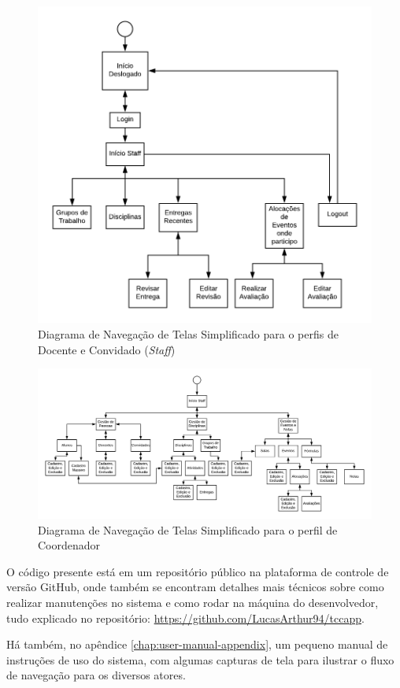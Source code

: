 \begin{figure}[!htpb]
    \centering
    \includegraphics[scale=1.1]{imagens/telas_staff.png}
    \caption{Diagrama de Navegação de Telas Simplificado para o perfis de Docente e Convidado (\textit{Staff})}
    \label{fig:telas-staff}
\end{figure}

\begin{figure}[!htpb]
    \centering
    \includegraphics[angle=90, origin=c,scale=0.8]{imagens/telas_coordenador.png}
    \caption{Diagrama de Navegação de Telas Simplificado para o perfil de Coordenador}
    \label{fig:telas-coordenador}
\end{figure}

O código presente está em um repositório público na plataforma de controle de versão GitHub, onde também se encontram detalhes mais técnicos sobre como realizar manutenções no sistema e como rodar na máquina do desenvolvedor, tudo explicado no repositório: \href{https://github.com/LucasArthur94/tccapp}{https://github.com/LucasArthur94/tccapp}.

Há também, no apêndice \ref{chap:user-manual-appendix}, um pequeno manual de instruções de uso do sistema, com algumas capturas de tela para ilustrar o fluxo de navegação para os diversos atores.